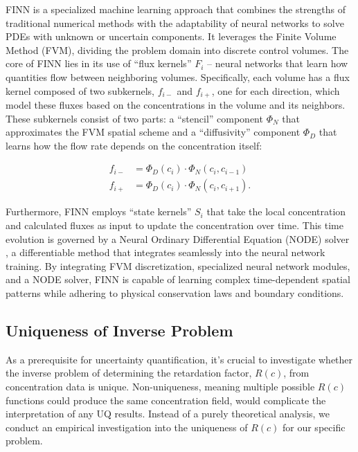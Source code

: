 FINN is a specialized machine learning approach that combines the strengths of traditional numerical methods with the adaptability of neural networks to solve PDEs with unknown or uncertain components. It leverages the Finite Volume Method (FVM), dividing the problem domain into discrete control volumes. The core of FINN lies in its use of ``flux kernels'' $F_i$ – neural networks that learn how quantities flow between neighboring volumes. Specifically, each volume has a flux kernel composed of two subkernels, $f_{i-}$ and $f_{i+}$, one for each direction, which model these fluxes based on the concentrations in the volume and its neighbors. These subkernels consist of two parts: a ``stencil'' component $\Phi_N$ that approximates the FVM spatial scheme and a ``diffusivity'' component $\Phi_D$ that learns how the flow rate depends on the concentration itself:

\begin{align*}
    f_{i-} &= \Phi_D(c_i) \cdot \Phi_N(c_i, c_{i-1}) \\
    f_{i+} &= \Phi_D(c_i) \cdot \Phi_N(c_i, c_{i+1}).
\end{align*}

Furthermore, FINN employs ``state kernels'' $S_i$ that take the local concentration and calculated fluxes as input to update the concentration over time. This time evolution is governed by a Neural Ordinary Differential Equation (NODE) solver \cite{chen2019neuralordinarydifferentialequations}, a differentiable method that integrates seamlessly into the neural network training. By integrating FVM discretization, specialized neural network modules, and a NODE solver, FINN is capable of learning complex time-dependent spatial patterns while adhering to physical conservation laws and boundary conditions.



\subsection{Uniqueness of Inverse Problem}
\label{sec:uniqueness}

As a prerequisite for uncertainty quantification, it's crucial to investigate whether the inverse problem of determining the retardation factor, $R(c)$, from concentration data is unique. Non-uniqueness, meaning multiple possible $R(c)$ functions could produce the same concentration field, would complicate the interpretation of any UQ results. Instead of a purely theoretical analysis, we conduct an empirical investigation into the uniqueness of $R(c)$ for our specific problem.

